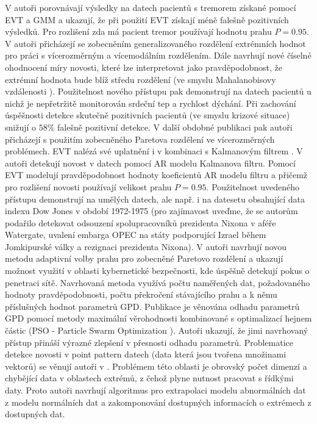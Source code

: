 V \cite{evt1} autoři porovnávají výsledky na datech pacientů s tremorem získané pomocí EVT a GMM a ukazují, že při použití EVT získají méně falešně pozitivních výsledků. Pro rozlišení zda má pacient tremor používají hodnotu prahu $P=0.95$. V \cite{evt3} autoři přicházejí se zobecněním generalizovaného rozdělení extrémních hodnot pro práci s vícerozměrným a vícemodálním rozdělením. Dále navrhují nové číselné ohodnocení míry novosti, které lze interpretovat jako pravděpodobnost, že extrémní hodnota bude blíž středu rozdělení (ve smyslu Mahalanobisovy vzdálenosti \cite{maha}). Použitelnost nového přístupu pak demonstrují na datech pacientů u nichž je nepřetržitě monitorován srdeční tep a rychlost dýchání. Při zachování úspěšnosti detekce skutečně pozitivních pacientů (ve smyslu krizové situace) snižují o $58\%$ falešně pozitivní detekce. V další obdobné publikaci \cite{evt5} pak autoři přicházejí s použitím zobecněného Paretova rozdělení  ve vícerozměrných problémech. EVT nalézá své uplatnění i v kombinaci s Kalmanovým filtrem \cite{kalman}. V \cite{evt4} autoři detekují novost v datech pomocí AR modelu Kalmanova filtru. Pomocí EVT modelují pravděpodobnost hodnoty koeficientů AR modelu filtru a přičemž pro rozlišení novosti používají velikost prahu $P=0.95$. Použitelnost uvedeného přístupu demonstrují na umělých datech, ale např. i na datesetu obsahující data indexu Dow Jones v období 1972-1975 (pro zajímavost uveďme, že se autorům podařilo detekovat odsouzení spolupracovníků prezidenta Nixona v aféře Watergate, uvalení embarga OPEC na státy podporující Izrael během Jomkipurské války a rezignaci prezidenta Nixona). V \cite{evt6} autoři navrhují novou metodu  adaptivní volby prahu pro zobecněné Paretovo rozdělení a ukazují možnost využití v oblasti kybernetické bezpečnosti, kde úspěšně detekují pokus o penetraci sítě. Navrhovaná metoda využívá počtu naměřených dat, požadovaného hodnoty pravděpodobnosti, počtu překročení stávajícího prahu a k němu příslušných hodnot parametrů GPD. Publikace \cite{evt7} je věnována odhadu parametrů GPD pomocí metody maximální věrohodnosti kombinované s optimalizací hejnem částic (PSO - Particle Swarm Optimization \cite{pso}). Autoři ukazují, že jimi navrhovaný přístup přináší výrazné zlepšení v přesnosti odhadu parametrů. Problematice detekce novosti v point pattern datech (data která jsou tvořena množinami vektorů) se věnují autoři v \cite{evt8}. Problémem této oblasti je obrovský počet dimenzí a chybějící data v oblastech extrémů, z čehož plyne nutnost pracovat s řídkými daty. Proto autoři navrhují algoritmus pro extrapolaci modelu abnormálních dat z modelu normálních dat a zakomponování dostupných informacích o extrémech z dostupných dat. 
